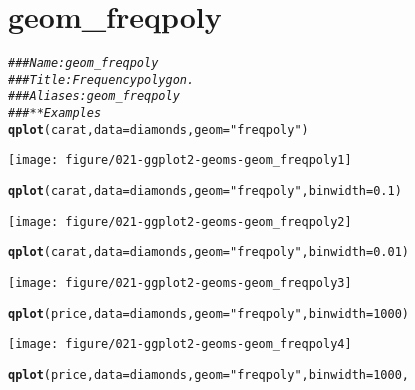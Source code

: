 \documentclass[a4paper,titlepage]{tufte-handout}\usepackage[]{graphicx}\usepackage[]{color}
\makeatletter
\def\maxwidth{ %
  \ifdim\Gin@nat@width>\linewidth
    \linewidth
  \else
    \Gin@nat@width
  \fi
}
\newcommand{\hlnum}[1]{\textcolor[rgb]{0.686,0.059,0.569}{#1}}%
\newcommand{\hlstr}[1]{\textcolor[rgb]{0.192,0.494,0.8}{#1}}%
\newcommand{\hlcom}[1]{\textcolor[rgb]{0.678,0.584,0.686}{\textit{#1}}}%
\newcommand{\hlstd}[1]{\textcolor[rgb]{0.345,0.345,0.345}{#1}}%
\newcommand{\hlkwc}[1]{\textcolor[rgb]{0.333,0.667,0.333}{#1}}%
\newcommand{\hlkwd}[1]{\textcolor[rgb]{0.737,0.353,0.396}{\textbf{#1}}}%
\newenvironment{kframe}{%
 \def\at@end@of@kframe{}%
 \ifinner\ifhmode%
  \def\at@end@of@kframe{\end{minipage}}%
  \begin{minipage}{\columnwidth}%
 \fi\fi%
 \def\FrameCommand##1{\hskip\@totalleftmargin \hskip-\fboxsep
 \colorbox{shadecolor}{##1}\hskip-\fboxsep
     \hskip-\linewidth \hskip-\@totalleftmargin \hskip\columnwidth}%
 \MakeFramed {\advance\hsize-\width
   \@totalleftmargin\z@ \linewidth\hsize
   \@setminipage}}%
 {\par\unskip\endMakeFramed%
 \at@end@of@kframe}
\newenvironment{knitrout}{}{} %
\makeatother
\begin{document}
\section{geom\_freqpoly}

\begin{knitrout}
\color{fgcolor}\begin{kframe}
\begin{alltt}
\hlcom{### Name: geom_freqpoly}
\hlcom{### Title: Frequency polygon.}
\hlcom{### Aliases: geom_freqpoly}
\hlcom{### ** Examples}
\hlkwd{qplot}\hlstd{(carat,} \hlkwc{data} \hlstd{= diamonds,} \hlkwc{geom} \hlstd{=} \hlstr{"freqpoly"}\hlstd{)}
\end{alltt}


{\ttfamily\noindent\itshape\color{messagecolor}{\#\# stat\_bin: binwidth defaulted to range/30. Use 'binwidth = x' to adjust this.}}\end{kframe}
\texttt{[image: figure/021-ggplot2-geoms-geom\_freqpoly1]} 
\begin{kframe}\begin{alltt}
\hlkwd{qplot}\hlstd{(carat,} \hlkwc{data} \hlstd{= diamonds,} \hlkwc{geom} \hlstd{=} \hlstr{"freqpoly"}\hlstd{,} \hlkwc{binwidth} \hlstd{=} \hlnum{0.1}\hlstd{)}
\end{alltt}
\end{kframe}
\texttt{[image: figure/021-ggplot2-geoms-geom\_freqpoly2]} 
\begin{kframe}\begin{alltt}
\hlkwd{qplot}\hlstd{(carat,} \hlkwc{data} \hlstd{= diamonds,} \hlkwc{geom} \hlstd{=} \hlstr{"freqpoly"}\hlstd{,} \hlkwc{binwidth} \hlstd{=} \hlnum{0.01}\hlstd{)}
\end{alltt}
\end{kframe}
\texttt{[image: figure/021-ggplot2-geoms-geom\_freqpoly3]} 
\begin{kframe}\begin{alltt}
\hlkwd{qplot}\hlstd{(price,} \hlkwc{data} \hlstd{= diamonds,} \hlkwc{geom} \hlstd{=} \hlstr{"freqpoly"}\hlstd{,} \hlkwc{binwidth} \hlstd{=} \hlnum{1000}\hlstd{)}
\end{alltt}
\end{kframe}
\texttt{[image: figure/021-ggplot2-geoms-geom\_freqpoly4]} 
\begin{kframe}\begin{alltt}
\hlkwd{qplot}\hlstd{(price,} \hlkwc{data} \hlstd{= diamonds,} \hlkwc{geom} \hlstd{=} \hlstr{"freqpoly"}\hlstd{,} \hlkwc{binwidth} \hlstd{=} \hlnum{1000}\hlstd{,}

\end{alltt}
\end{kframe}
\end{knitrout}
\end{document}
